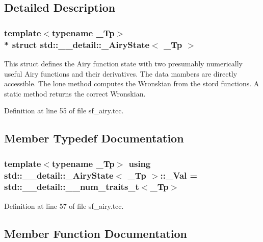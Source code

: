 \subsection{Detailed Description}
\subsubsection*{template$<$typename \+\_\+\+Tp$>$\\*
struct std\+::\+\_\+\+\_\+detail\+::\+\_\+\+Airy\+State$<$ \+\_\+\+Tp $>$}

This struct defines the Airy function state with two presumably numerically useful Airy functions and their derivatives. The data mambers are directly accessible. The lone method computes the Wronskian from the stord functions. A static method returns the correct Wronskian. 

Definition at line 55 of file sf\+\_\+airy.\+tcc.



\subsection{Member Typedef Documentation}
\subsubsection[{\texorpdfstring{\+\_\+\+Val}{_Val}}]{\setlength{\rightskip}{0pt plus 5cm}template$<$typename \+\_\+\+Tp$>$ using {\bf std\+::\+\_\+\+\_\+detail\+::\+\_\+\+Airy\+State}$<$ \+\_\+\+Tp $>$\+::{\bf \+\_\+\+Val} =  std\+::\+\_\+\+\_\+detail\+::\+\_\+\+\_\+num\+\_\+traits\+\_\+t$<$\+\_\+\+Tp$>$}\hypertarget{structstd_1_1____detail_1_1__AiryState_ade9eab191e3cc77ebd4e3522aa1fe959}{}\label{structstd_1_1____detail_1_1__AiryState_ade9eab191e3cc77ebd4e3522aa1fe959}


Definition at line 57 of file sf\+\_\+airy.\+tcc.



\subsection{Member Function Documentation}

